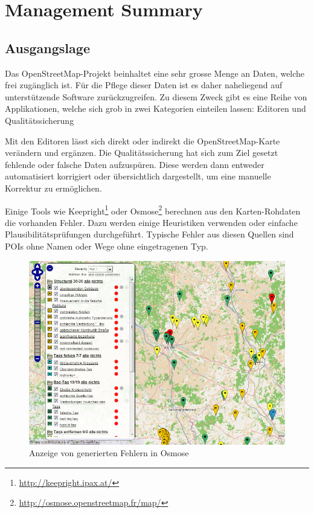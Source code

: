 \chapter*{Management Summary}
\thispagestyle{scrheadings}

\section*{Ausgangslage}
Das OpenStreetMap-Projekt beinhaltet eine sehr grosse Menge an Daten, welche frei zugänglich ist.
Für die Pflege dieser Daten ist es daher naheliegend auf unterstützende Software zurückzugreifen.
Zu diesem Zweck gibt es eine Reihe von Applikationen, welche sich grob in zwei Kategorien einteilen lassen:
Editoren und Qualitätssicherung

Mit den Editoren lässt sich direkt oder indirekt die OpenStreetMap-Karte verändern und ergänzen.
Die Qualitätssicherung hat sich zum Ziel gesetzt fehlende oder falsche Daten aufzuspüren.
Diese werden dann entweder automatisiert korrigiert oder übersichtlich dargestellt, um eine manuelle Korrektur zu ermöglichen.

Einige Tools wie Keepright\footnote{\url{http://keepright.ipax.at/}} oder Osmose\footnote{\url{http://osmose.openstreetmap.fr/map/}} berechnen aus den Karten-Rohdaten die vorhanden Fehler.
Dazu werden einige Heuristiken verwenden oder einfache Plausibilitätsprüfungen durchgeführt.
Typische Fehler aus diesen Quellen sind \gls{POI}s ohne Namen oder Wege ohne eingetragenen Typ.

\begin{figure}[H]
	\centering
	\includegraphics[scale=0.4]{images/managementsummary/osmose-screenshot}
	\caption{Anzeige von generierten Fehlern in Osmose}
	\label{image-osmose-screenshot}
\end{figure}

